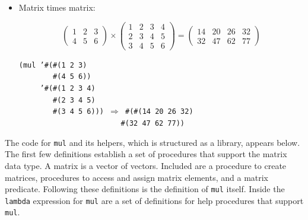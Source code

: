 \begin{itemize}
\[
\begin{pmatrix}
2 & 3 & 4 \\
3 & 4 & 5
\end{pmatrix}
\times
\begin{pmatrix}
1 \\
2 \\
3
\end{pmatrix}
=
\begin{pmatrix}
20 \\
26
\end{pmatrix}
\]



\begin{alltt}
(mul '\#{}(\#{}(2 3 4)
        \#{}(3 4 5))
     '\#{}(\#{}(1) \#{}(2) \#{}(3))) \(\Rightarrow\) \#{}(\#{}(20) \#{}(26))
\end{alltt}

\item 
Matrix times matrix:


\[
\begin{pmatrix}
1 & 2 & 3 \\
4 & 5 & 6
\end{pmatrix}
\times
\begin{pmatrix}
1 & 2 & 3 & 4 \\
2 & 3 & 4 & 5 \\
3 & 4 & 5 & 6
\end{pmatrix}
=
\begin{pmatrix}
14 & 20 & 26 & 32 \\
32 & 47 & 62 & 77
\end{pmatrix}\]



\begin{alltt}
(mul '\#{}(\#{}(1 2 3)
        \#{}(4 5 6))
     '\#{}(\#{}(1 2 3 4)
        \#{}(2 3 4 5)
        \#{}(3 4 5 6))) \(\Rightarrow\) \#{}(\#{}(14 20 26 32)
                        \#{}(32 47 62 77))
\end{alltt}


\end{itemize}


The code for \texttt{mul} and its helpers, which is structured as
a library, appears below.
The first few definitions establish a set of procedures that support
the matrix data type.
A matrix is a vector of \label{examples_s3}vectors.
Included are a procedure to create matrices, procedures to access and
assign matrix elements, and a matrix predicate.
Following these definitions is the definition of \texttt{mul} itself.
Inside the \texttt{lambda} expression for \texttt{mul} are a set of definitions
for help procedures that support \texttt{mul}.

